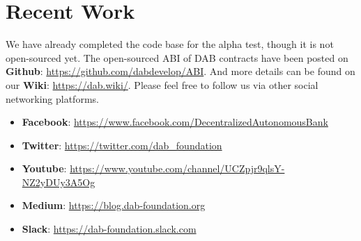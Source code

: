 \documentclass[review]{elsarticle}
\begin{document}
\section{Recent Work}

We have already completed the code base for the alpha test, though it is not open-sourced yet. The open-sourced ABI of DAB contracts have been posted on \textbf{Github}: \underline{https://github.com/dabdevelop/ABI}. And more details can be found on our \textbf{Wiki}: \underline{https://dab.wiki/}. Please feel free to follow us via other social networking platforms.

\begin{itemize}
   \item \textbf{Facebook}: \underline{https://www.facebook.com/DecentralizedAutonomousBank}
   \item \textbf{Twitter}: \underline{https://twitter.com/dab\_foundation}
   \item \textbf{Youtube}: \underline{https://www.youtube.com/channel/UCZpjr9qlsY-NZ2yDUy3A5Og}
   \item \textbf{Medium}: \underline{https://blog.dab-foundation.org}
   \item \textbf{Slack}: \underline{https://dab-foundation.slack.com}
\end{itemize}
\end{document}
